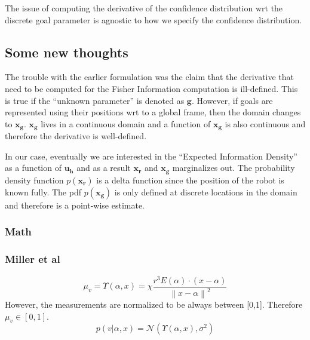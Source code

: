 \documentclass[]{article}
\newcommand{\norm}[1]{\left\lVert#1\right\rVert}
\begin{document}
The issue of computing the derivative of the confidence distribution wrt the discrete goal parameter is agnostic to how we specify the confidence distribution. 


\subsection*{Some new thoughts}

The trouble with the earlier formulation was the claim that the derivative that need to be computed for the Fisher Information computation is ill-defined. This is true if the ``unknown parameter'' is denoted as $\boldsymbol{g}$. However, if goals are represented using their positions wrt to a global frame, then the domain changes to $\boldsymbol{x_g}$. $\boldsymbol{x_g}$ lives in a continuous domain and a function of $\boldsymbol{x_g}$ is also continuous and therefore the derivative is well-defined. 

In our case, eventually we are interested in the ``Expected Information Density'' as a function of $\boldsymbol{u_h}$ and as a result $\boldsymbol{x_r}$ and $\boldsymbol{x_g}$ marginalizes out. The probability density function $p(\boldsymbol{x_r})$ is a delta function since the position of the robot is known fully. The pdf $p(\boldsymbol{x_g})$ is only defined at discrete locations in the domain and therefore is a point-wise estimate. 

\subsubsection*{Math}

\subsubsection*{Miller et al}

\begin{equation*}
\mu_v = \Upsilon(\alpha, x) = \chi \frac{r^3E(\alpha)\cdot(x - \alpha)}{\norm{x -\alpha}^2}
\end{equation*}
However, the measurements are normalized to be always between [0,1]. Therefore $\mu_v \in [0,1]$.
\begin{equation*}
	p(v | \alpha, x) = \mathcal{N}(\Upsilon(\alpha, x), \sigma^2)
\end{equation*}
\end{document}

